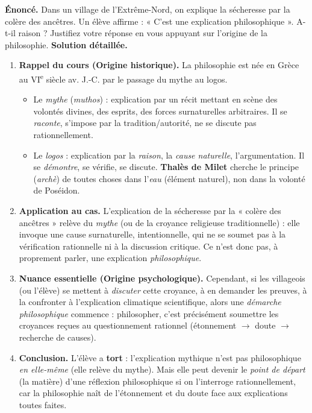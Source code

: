 \documentclass[11pt]{article}
\newcommand{\cle}[1]{{\popxbold\color{popdark}#1}}
\begin{document}
\begin{exoresolu}
\textbf{Énoncé.} Dans un village de l'Extrême-Nord, on explique la sécheresse par la colère des ancêtres. Un élève affirme : « C'est une explication philosophique ». A-t-il raison ? Justifiez votre réponse en vous appuyant sur l'origine de la philosophie.
\tcblower
\textbf{Solution détaillée.}

\begin{enumerate}
\item \textbf{Rappel du cours (Origine historique).} La philosophie est née en Grèce au VI\textsuperscript{e} siècle av. J.-C. par le passage du \cle{mythe} au \cle{logos}.
    \begin{itemize}
    \item Le \emph{mythe} (\emph{muthos}) : explication par un récit mettant en scène des volontés divines, des esprits, des forces surnaturelles arbitraires. Il se \emph{raconte}, s'impose par la tradition/autorité, ne se discute pas rationnellement.
    \item Le \emph{logos} : explication par la \emph{raison}, la \emph{cause naturelle}, l'argumentation. Il se \emph{démontre}, se vérifie, se discute. \textbf{Thalès de Milet} cherche le principe (\emph{archè}) de toutes choses dans l'\emph{eau} (élément naturel), non dans la volonté de Poséidon.
    \end{itemize}
\item \textbf{Application au cas.} L'explication de la sécheresse par la « colère des ancêtres » relève du \emph{mythe} (ou de la croyance religieuse traditionnelle) : elle invoque une cause surnaturelle, intentionnelle, qui ne se soumet pas à la vérification rationnelle ni à la discussion critique. Ce n'est donc pas, à proprement parler, une explication \emph{philosophique}.
\item \textbf{Nuance essentielle (Origine psychologique).} Cependant, si les villageois (ou l'élève) se mettent à \emph{discuter} cette croyance, à en demander les preuves, à la confronter à l'explication climatique scientifique, alors une \emph{démarche philosophique} commence : philosopher, c'est précisément soumettre les croyances reçues au questionnement rationnel (étonnement $\rightarrow$ doute $\rightarrow$ recherche de causes).
\item \textbf{Conclusion.} L'élève a \textbf{tort} : l'explication mythique n'est pas philosophique \emph{en elle-même} (elle relève du mythe). Mais elle peut devenir le \emph{point de départ} (la matière) d'une réflexion philosophique si on l'interroge rationnellement, car la philosophie naît de l'étonnement et du doute face aux explications toutes faites.
\end{enumerate}
\end{exoresolu}
\end{document}
